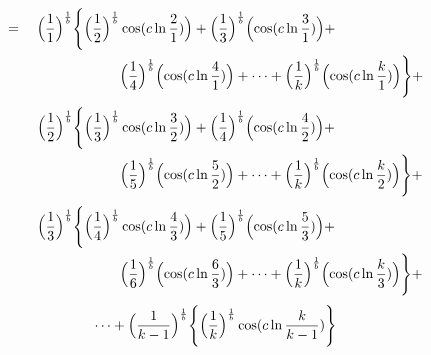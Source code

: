 \documentclass{amsart}
\begin{document}
	\[
	\begin{aligned}
		= \quad \Bigl( \frac{1}{1} \Bigr)^\frac1b \Biggl\{ \Bigl( \frac{1}{2} \Bigr)^\frac1b &\cos(c \ln \frac{2}{1}) \Bigr) + \Bigl( \frac{1}{3} \Bigr)^\frac1b \Bigl( \cos(c \ln \frac{3}{1}) \Bigr) + \\
		& \Bigl( \frac{1}{4} \Bigr)^\frac1b \Bigl( \cos(c \ln \frac{4}{1}) \Bigr) + \dots  + \Bigl( \frac{1}{k} \Bigr)^\frac1b \Bigl( \cos(c \ln \frac{k}{1}) \Bigr) \Biggr\} + 
	\end{aligned}
	\]
	\[
	\begin{aligned}
		\quad\quad \Bigl( \frac{1}{2}  \Bigr)^\frac1b \Biggl\{ \Bigl( \frac{1}{3} \Bigr)^\frac1b &\cos(c \ln \frac{3}{2}) \Bigr) + \Bigl( \frac{1}{4} \Bigr)^\frac1b \Bigl( \cos(c \ln \frac{4}{2}) \Bigr) + \\
		& \Bigl( \frac{1}{5} \Bigr)^\frac1b \Bigl( \cos(c \ln \frac{5}{2}) \Bigr) + \dots  + \Bigl( \frac{1}{k} \Bigr)^\frac1b \Bigl( \cos(c \ln \frac{k}{2}) \Bigr) \Biggr\} + 
	\end{aligned}
	\]
	\[
	\begin{aligned}
		\quad\quad \Bigl( \frac{1}{3} \Bigr)^\frac1b \Biggl\{ \Bigl( \frac{1}{4} \Bigr)^\frac1b &\cos(c \ln \frac{4}{3}) \Bigr) + \Bigl( \frac{1}{5} \Bigr)^\frac1b \Bigl( \cos(c \ln \frac{5}{3}) \Bigr) + \\
		& \Bigl( \frac{1}{6} \Bigr)^\frac1b \Bigl( \cos(c \ln \frac{6}{3}) \Bigr) + \dots  + \Bigl( \frac{1}{k} \Bigr)^\frac1b \Bigl( \cos(c \ln \frac{k}{3}) \Bigr) \Biggr\} + 
	\end{aligned}
	\]
	\[ \dots + \Bigl( \frac{1}{k-1} \Bigr)^\frac1b \Biggl\{ \Bigl( \frac{1}{k} \Bigr)^\frac1b \cos(c \ln \frac{k}{k-1}) \Biggr\} \]
	
\end{document}
